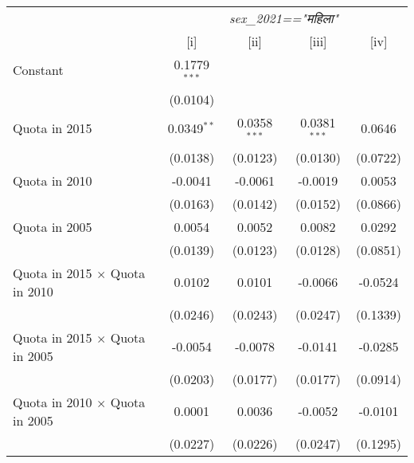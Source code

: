 
\begingroup
\centering
\begin{tabular}{lcccc}
   \toprule
    & \multicolumn{4}{c}{\textit{sex\_2021=="महिला"}}\\
                                                                 & [i]            & [ii]           & [iii]          & [iv]\\  
   \midrule 
   Constant                                                      & 0.1779$^{***}$ &                &                &   \\   
                                                                 & (0.0104)       &                &                &   \\   
   Quota in 2015                                                 & 0.0349$^{**}$  & 0.0358$^{***}$ & 0.0381$^{***}$ & 0.0646\\   
                                                                 & (0.0138)       & (0.0123)       & (0.0130)       & (0.0722)\\   
   Quota in 2010                                                 & -0.0041        & -0.0061        & -0.0019        & 0.0053\\   
                                                                 & (0.0163)       & (0.0142)       & (0.0152)       & (0.0866)\\   
   Quota in 2005                                                 & 0.0054         & 0.0052         & 0.0082         & 0.0292\\   
                                                                 & (0.0139)       & (0.0123)       & (0.0128)       & (0.0851)\\   
   Quota in 2015 $\times$ Quota in 2010                          & 0.0102         & 0.0101         & -0.0066        & -0.0524\\   
                                                                 & (0.0246)       & (0.0243)       & (0.0247)       & (0.1339)\\   
   Quota in 2015 $\times$ Quota in 2005                          & -0.0054        & -0.0078        & -0.0141        & -0.0285\\   
                                                                 & (0.0203)       & (0.0177)       & (0.0177)       & (0.0914)\\   
   Quota in 2010 $\times$ Quota in 2005                          & 0.0001         & 0.0036         & -0.0052        & -0.0101\\   
                                                                 & (0.0227)       & (0.0226)       & (0.0247)       & (0.1295)\\   

\end{tabular}
